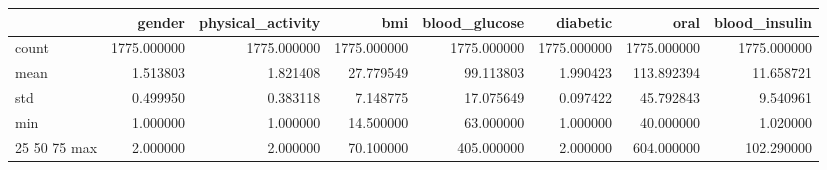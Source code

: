 \begin{tabular}{lrrrrrrr}
\toprule
 & gender & physical_activity & bmi & blood_glucose & diabetic & oral & blood_insulin \\
\midrule
count & 1775.000000 & 1775.000000 & 1775.000000 & 1775.000000 & 1775.000000 & 1775.000000 & 1775.000000 \\
mean & 1.513803 & 1.821408 & 27.779549 & 99.113803 & 1.990423 & 113.892394 & 11.658721 \\
std & 0.499950 & 0.383118 & 7.148775 & 17.075649 & 0.097422 & 45.792843 & 9.540961 \\
min & 1.000000 & 1.000000 & 14.500000 & 63.000000 & 1.000000 & 40.000000 & 1.020000 \\
25%
50%
75%
max & 2.000000 & 2.000000 & 70.100000 & 405.000000 & 2.000000 & 604.000000 & 102.290000 \\
\bottomrule
\end{tabular}
